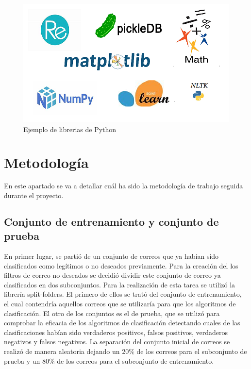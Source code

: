 \documentclass[conference,a4paper]{IEEEtran}
\begin{document}
\begin{figure}
  \centering
  \includegraphics{librerias}
  \caption{Ejemplo de librerias de Python}
  \label{fig:librerias}
\end{figure}


\section{Metodología}

En este apartado se va a detallar cuál ha sido la metodología de trabajo seguida durante el proyecto. 


\subsection{Conjunto de entrenamiento y conjunto de prueba}
En primer lugar, se partió de un conjunto de correos que ya habían sido clasificados como legítimos o no deseados previamente. Para la creación del los filtros de correo no deseados se decidió dividir este conjunto de correo ya clasificados en dos subconjuntos. Para la realización de esta tarea se utilizó la librería split-folders. El primero de ellos se trató del conjunto de entrenamiento, el cual contendría aquellos correos que se utilizaría para que los algoritmos de clasificación. El otro de los conjuntos es el de prueba, que se utilizó para comprobar la eficacia de los algoritmos de clasificación detectando cuales de las clasificaciones habían sido verdaderos positivos, falsos positivos, verdaderos negativos y falsos negativos. La separación del conjunto inicial de correos se realizó de manera aleatoria dejando un 20\% de los correos para el subconjunto de prueba y un 80\% de los correos para el subconjunto de entrenamiento.
\end{document}

